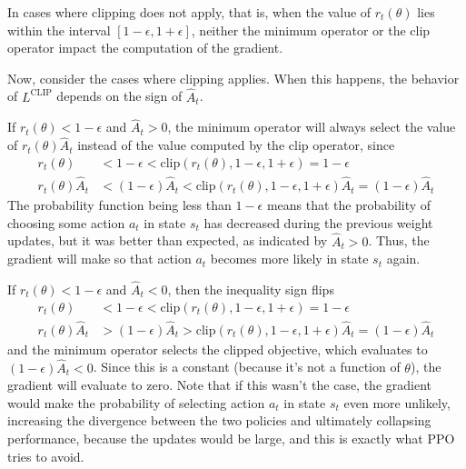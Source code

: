 In cases where clipping does not apply, that is, when the value of $r_t(\theta)$ lies within the interval $[1-\epsilon, 1+\epsilon]$, neither the minimum operator or the clip operator impact the computation of the gradient.

Now, consider the cases where clipping applies. When this happens, the behavior of $L^\text{CLIP}$ depends on the sign of $\hat{A}_t$.

If $r_t(\theta) < 1 - \epsilon$ and $\hat{A}_t > 0$, the minimum operator will always select the value of $r_t(\theta)\hat{A}_t$ instead of the value computed by the clip operator, since
\begin{align*}
    r_t(\theta) &< 1 - \epsilon < \text{clip}\left(r_t(\theta), 1- \epsilon, 1+\epsilon\right) = 1 - \epsilon\\
    r_t(\theta)\hat{A}_t &< (1 - \epsilon)\hat{A}_t < \text{clip}\left(r_t(\theta), 1 - \epsilon, 1+\epsilon\right)\hat{A}_t = (1 - \epsilon)\hat{A}_t
\end{align*}
The probability function being less than $1 - \epsilon$ means that the probability of choosing some action $a_t$ in state $s_t$ has decreased during the previous weight updates, but it was better than expected, as indicated by $\hat{A}_t > 0$. Thus, the gradient will make so that action $a_t$ becomes more likely in state $s_t$ again.

If $r_t(\theta) < 1 - \epsilon$ and $\hat{A}_t < 0$, then the inequality sign flips
\begin{align*}
    r_t(\theta) &< 1 - \epsilon < \text{clip}\left(r_t(\theta), 1- \epsilon, 1+\epsilon\right) = 1 - \epsilon\\
    r_t(\theta)\hat{A}_t &> (1 - \epsilon)\hat{A}_t > \text{clip}\left(r_t(\theta), 1 - \epsilon, 1+\epsilon\right)\hat{A}_t = (1 - \epsilon)\hat{A}_t
\end{align*}
and the minimum operator selects the clipped objective, which evaluates to $(1 - \epsilon)\hat{A}_t < 0$. Since this is a constant (because it's not a function of $\theta$), the gradient will evaluate to zero. Note that if this wasn't the case, the gradient would make the probability of selecting action $a_t$ in state $s_t$ even more unlikely, increasing the divergence between the two policies and ultimately collapsing performance, because the updates would be large, and this is exactly what PPO tries to avoid.

